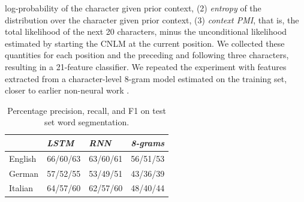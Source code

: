 log-probability of the character given prior context, (2)
\emph{entropy} of the distribution over the character given prior
context, (3) \emph{context PMI}, that is, the total
 likelihood of the next 20 characters, minus the unconditional
 likelihood estimated by starting the CNLM at the current position. %
 We collected these quantities for each position and the preceding
 and following three characters, resulting in a 21-feature classifier. %
We repeated the  experiment with features extracted from a
character-level 8-gram model estimated on the training set, closer to
 earlier non-neural work
\cite{saffran-word-1996, feng-accessor-2004}.


\begin{table}[t]
	\small
  \begin{center}
    \begin{tabular}{l|l|l|l}
      \multicolumn{1}{c|}{}&\emph{LSTM}&\emph{RNN}&\emph{8-grams}\\
      \hline
      English & 66/60/63 &   63/60/61 & 56/51/53    \\ %
      German &  57/52/55 &  53/49/51 & 43/36/39   \\ %
      Italian &  64/57/60 & 62/57/60  & 48/40/44    \\ %
    \end{tabular}
  \end{center}
  \caption{\label{tab:segmentation-results} Percentage precision, recall, and F1 on test set word segmentation.}
\end{table}


